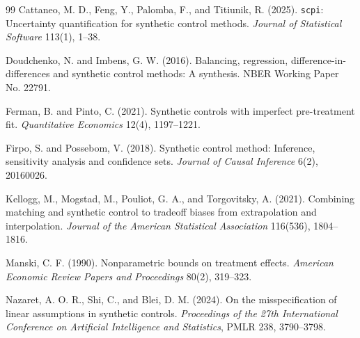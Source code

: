 \documentclass[11pt]{article}
\theoremstyle{definition}
\theoremstyle{plain}
\theoremstyle{remark}
\begin{document}
\begin{thebibliography}{99}
Cattaneo, M. D., Feng, Y., Palomba, F., and Titiunik, R. (2025).
\texttt{scpi}: Uncertainty quantification for synthetic control methods.
\emph{Journal of Statistical Software} 113(1), 1--38.

Doudchenko, N. and Imbens, G. W. (2016).
Balancing, regression, difference-in-differences and synthetic control methods: A synthesis.
NBER Working Paper No. 22791.

Ferman, B. and Pinto, C. (2021).
Synthetic controls with imperfect pre-treatment fit.
\emph{Quantitative Economics} 12(4), 1197--1221.

Firpo, S. and Possebom, V. (2018).
Synthetic control method: Inference, sensitivity analysis and confidence sets.
\emph{Journal of Causal Inference} 6(2), 20160026.

Kellogg, M., Mogstad, M., Pouliot, G. A., and Torgovitsky, A. (2021).
Combining matching and synthetic control to tradeoff biases from extrapolation and interpolation.
\emph{Journal of the American Statistical Association} 116(536), 1804--1816.

Manski, C. F. (1990).
Nonparametric bounds on treatment effects.
\emph{American Economic Review Papers and Proceedings} 80(2), 319--323.

Nazaret, A. O. R., Shi, C., and Blei, D. M. (2024).
On the misspecification of linear assumptions in synthetic controls.
\emph{Proceedings of the 27th International Conference on Artificial Intelligence and Statistics}, PMLR 238, 3790--3798.
\end{thebibliography}
\end{document}
